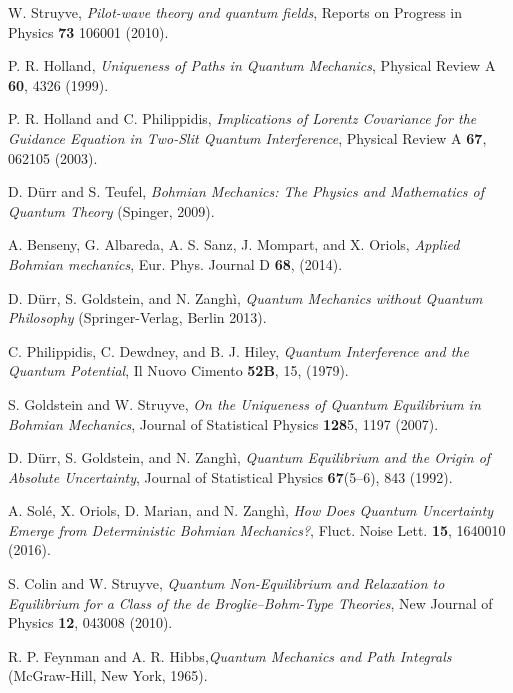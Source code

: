 \documentclass[nofootinbib, secnumarabic, amsmath, nobibnotes,11pt,aps,pra, floatfix]{revtex4-1}
\begin{document}
\begin{thebibliography}{999}
W. Struyve, \emph{Pilot-wave theory and quantum fields}, Reports on Progress in Physics \textbf{73}  106001 (2010).  

P. R. Holland, \emph{Uniqueness of Paths in Quantum Mechanics}, Physical Review A \textbf{60}, 4326 (1999).

P. R. Holland and C. Philippidis, \emph{Implications of Lorentz Covariance for the Guidance Equation in Two-Slit Quantum Interference}, Physical Review A \textbf{67}, 062105 (2003).

D. D\"{u}rr and S. Teufel, \emph{Bohmian Mechanics: The Physics and Mathematics of Quantum Theory} (Spinger, 2009).

 A. Benseny, G. Albareda, A. S. Sanz, J. Mompart, and X. Oriols, \emph{Applied Bohmian mechanics}, Eur. Phys. Journal D \textbf{68},  (2014).

 D. D\"{u}rr, S. Goldstein, and N. Zangh\`i, \emph{Quantum Mechanics without Quantum Philosophy} (Springer-Verlag, Berlin 2013).

C. Philippidis, C. Dewdney, and B. J. Hiley, \emph{ Quantum Interference and the Quantum Potential},  Il Nuovo Cimento {\bf 52B},  15, (1979).

S. Goldstein and W. Struyve, \emph{On the Uniqueness of Quantum Equilibrium in Bohmian Mechanics}, Journal of Statistical Physics \textbf{128}5,  1197 (2007).

D. D\"{u}rr, S. Goldstein, and N. Zangh\`i, \emph{Quantum Equilibrium and the Origin of Absolute Uncertainty}, Journal of Statistical Physics \textbf{67}(5--6),  843 (1992).

  A. Sol\'e, X. Oriols, D. Marian, and N. Zangh\`i, \emph{How Does Quantum Uncertainty Emerge from Deterministic Bohmian Mechanics?}, Fluct. Noise Lett. \textbf{15},   1640010 (2016).

S. Colin and W. Struyve, \emph{Quantum Non-Equilibrium and Relaxation to Equilibrium for a Class of the de Broglie--Bohm-Type Theories}, New Journal of Physics \textbf{12},  043008 (2010).

R. P. Feynman and A. R. Hibbs,\emph{Quantum Mechanics and Path Integrals} (McGraw-Hill, New York, 1965).


\end{thebibliography}
\end{document}
